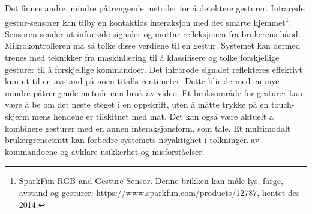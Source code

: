 Det finnes andre, mindre påtrengende metoder for å detektere gesturer. Infrarøde gestur-sensorer kan tilby en kontaktløs interaksjon med det smarte hjemmet\footnote{SparkFun RGB and Gesture Sensor. Denne brikken kan måle lys, farge, avstand og gesturer: https://www.sparkfun.com/products/12787, hentet des 2014.}. Sensoren sender ut infrarøde signaler og mottar refleksjonen fra brukerens hånd. Mikrokontrolleren må så tolke disse verdiene til en gestur. Systemet kan dermed trenes med teknikker fra maskinlæring til å klassifisere og tolke forskjellige gesturer til å forskjellige kommandoer. Det infrarøde signalet reflekteres effektivt kun ut til en avstand på noen titalls centimeter. Dette blir dermed en mye mindre påtrengende metode enn bruk av video. Et bruksområde for gesturer kan være å be om det neste steget i en oppskrift, uten å måtte trykke på en touch-skjerm mens hendene er tilskitnet med mat. Det kan også være aktuelt å kombinere gesturer med en annen interaksjonsform, som tale. Et multimodalt brukergrensesnitt kan forbedre systemets nøyaktighet i tolkningen av kommandoene og avklare usikkerhet og misforståelser.

